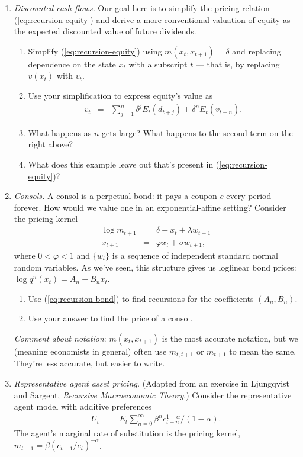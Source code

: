 \documentclass[11pt]{article}
\begin{document}
\begin{enumerate}
\item {\it Discounted cash flows.\/}
Our goal here is to simplify the pricing relation (\ref{eq:recursion-equity})
and derive a more conventional valuation of equity
as the expected discounted value of future dividends.
\begin{enumerate}
\item Simplify (\ref{eq:recursion-equity}) using $ m(x_t,x_{t+1}) = \delta $
and replacing dependence on the state $x_t$ with a subscript $t$ ---
that is, by replacing $v(x_t)$ with $v_t$.
\item Use your simplification to express equity's value as
\begin{eqnarray*}
    v_t &=& \sum_{j=1}^n \delta^j E_t (d_{t+j}) + \delta^n E_t (v_{t+n}) .
\end{eqnarray*}
\item What happens as $n$ gets large?
What happens to the second term on the right above?
\item What does this example leave out that's present in (\ref{eq:recursion-equity})?
\end{enumerate}

\item {\it Consols.\/}
A consol is a perpetual bond:  it pays a coupon $c$ every period forever.
How would we value one in an exponential-affine setting?
Consider the pricing kernel
\begin{eqnarray*}
    \log m_{t+1} &=& \delta + x_t + \lambda w_{t+1} \\
    x_{t+1} &=& \varphi x_t + \sigma w_{t+1} ,
\end{eqnarray*}
where $ 0 < \varphi < 1$ and $\{ w_t\} $ is a sequence
of independent standard normal random variables.
As we've seen, this structure gives us loglinear
bond prices:
$ \log q^n(x_t) = A_n + B_n x_t $.
%
\begin{enumerate}
\item Use (\ref{eq:recursion-bond}) to find recursions for the coefficients
$(A_n,B_n)$.
\item Use your answer to find the price of a consol.
\end{enumerate}
{\it Comment about notation\/}:
$m(x_t,x_{t+1})$ is the most accurate notation,
but we (meaning economists in general) often use $m_{t,t+1}$ or $m_{t+1}$
to mean the same.
They're less accurate, but easier to write.



\item {\it Representative agent asset pricing.\/}
(Adapted from an exercise in Ljungqvist and Sargent, {\it Recursive Macroeconomic Theory\/}.)
Consider the representative agent model with additive preferences
\begin{eqnarray*}
    U_t &=& E_t \sum_{n=0}^\infty \beta^n c_{t+n}^{1-\alpha} /(1-\alpha) .
\end{eqnarray*}
The agent's marginal rate of substitution is the pricing kernel,
 $ m_{t+1} = \beta (c_{t+1}/c_t)^{-\alpha} $.


\end{enumerate}
\end{document}
